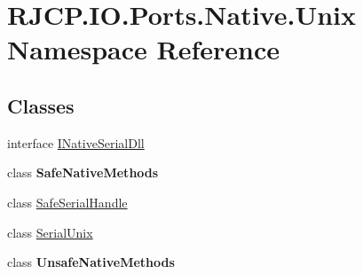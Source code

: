 \hypertarget{namespace_r_j_c_p_1_1_i_o_1_1_ports_1_1_native_1_1_unix}{}\section{R\+J\+C\+P.\+I\+O.\+Ports.\+Native.\+Unix Namespace Reference}
\label{namespace_r_j_c_p_1_1_i_o_1_1_ports_1_1_native_1_1_unix}
\subsection*{Classes}
\begin{DoxyCompactItemize}
\item 
interface \mbox{\hyperlink{interface_r_j_c_p_1_1_i_o_1_1_ports_1_1_native_1_1_unix_1_1_i_native_serial_dll}{I\+Native\+Serial\+Dll}}
\item 
class {\bfseries Safe\+Native\+Methods}
\item 
class \mbox{\hyperlink{class_r_j_c_p_1_1_i_o_1_1_ports_1_1_native_1_1_unix_1_1_safe_serial_handle}{Safe\+Serial\+Handle}}
\item 
class \mbox{\hyperlink{class_r_j_c_p_1_1_i_o_1_1_ports_1_1_native_1_1_unix_1_1_serial_unix}{Serial\+Unix}}
\item 
class {\bfseries Unsafe\+Native\+Methods}
\end{DoxyCompactItemize}
